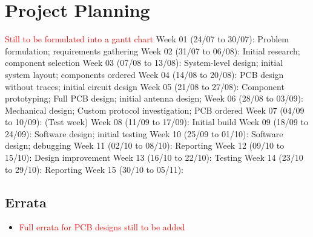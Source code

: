 \graphicspath{{./figures}}

\chapter{Project Planning}
\textcolor{red}{Still to be formulated into a gantt chart}
Week 01 (24/07 to 30/07): Problem formulation; requirements gathering
Week 02 (31/07 to 06/08): Initial research; component selection
Week 03 (07/08 to 13/08): System-level design; initial system layout; components ordered
Week 04 (14/08 to 20/08): PCB design without traces; initial circuit design
Week 05 (21/08 to 27/08): Component prototyping; Full PCB design; initial antenna design;
Week 06 (28/08 to 03/09): Mechanical design; Custom protocol investigation; PCB ordered
Week 07 (04/09 to 10/09): (Test week)
Week 08 (11/09 to 17/09): Initial build
Week 09 (18/09 to 24/09): Software design; initial testing
Week 10 (25/09 to 01/10): Software design; debugging
Week 11 (02/10 to 08/10): Reporting
Week 12 (09/10 to 15/10): Design improvement
Week 13 (16/10 to 22/10): Testing
Week 14 (23/10 to 29/10): Reporting
Week 15 (30/10 to 05/11):



\section{Errata}\label{sec:appendix_pcb_errata}
\begin{itemize}
    \item \textcolor{red}{Full errata for PCB designs still to be added}
\end{itemize}






